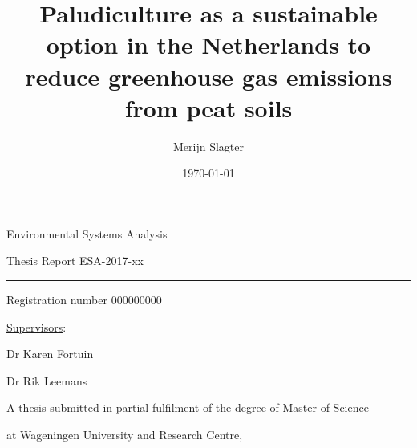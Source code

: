 \documentclass[a4paper,12pt]{scrbook}
\title{Paludiculture as a sustainable option in the Netherlands to reduce greenhouse gas emissions from peat soils}
\author{Merijn Slagter}
\date{\today}
\begin{document}
 \begin{titlingpage}
  {\Large Environmental Systems Analysis}\vspace{0.9cm}
  
  {\Large Thesis Report ESA-2017-xx}\vspace{0.9cm}
  
  \hrule\vspace{1.1cm}
  
  {\bfseries \Large \MakeUppercase{\thetitle}}\vspace{2.0cm}
  
%  
  {\Large \theauthor}\vspace{5.5cm}
  
  \vspace{1.5cm}
  
  
  
  \thispagestyle{empty}
  
  \begin{center}
  {\bfseries \Large \thetitle}\vspace{2.7cm}
  
  {\Large \theauthor}\vspace{1.1cm}
  
  {Registration number 000000000}\vspace{3.5cm}
  
  {\large \underline{Supervisors}:}\vspace{1.1cm}
  
  {Dr Karen Fortuin}
  
  {Dr Rik Leemans}\vspace{3.0cm}
  
  {A thesis submitted in partial fulfilment of the degree of Master of Science}
  
  {at Wageningen University and Research Centre,}
  

\end{center}
\end{titlingpage}
\end{document}
